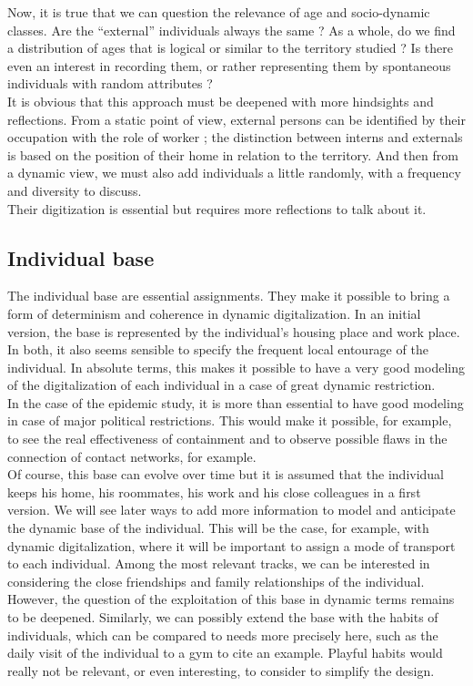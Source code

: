 Now, it is true that we can question the relevance of age and socio-dynamic classes. Are the ``external'' individuals always the same ? As a whole, do we find a distribution of ages that is logical or similar to the territory studied ? Is there even an interest in recording them, or rather representing them by spontaneous individuals with random attributes ?\\

It is obvious that this approach must be deepened with more hindsights and reflections. From a static point of view, external persons can be identified by their occupation with the role of worker ; the distinction between interns and externals is based on the position of their home in relation to the territory. And then from a dynamic view, we must also add individuals a little randomly, with a frequency and diversity to discuss.\\

Their digitization is essential but requires more reflections to talk about it.\\

\subsection{Individual base}

The individual base are essential assignments. They make it possible to bring a form of determinism and coherence in dynamic digitalization. In an initial version, the base is represented by the individual's housing place and work place. In both, it also seems sensible to specify the frequent local entourage of the individual. In absolute terms, this makes it possible to have a very good modeling of the digitalization of each individual in a case of great dynamic restriction.\\

In the case of the epidemic study, it is more than essential to have good modeling in case of major political restrictions. This would make it possible, for example, to see the real effectiveness of containment and to observe possible flaws in the connection of contact networks, for example.\\

Of course, this base can evolve over time but it is assumed that the individual keeps his home, his roommates, his work and his close colleagues in a first version. We will see later ways to add more information to model and anticipate the dynamic base of the individual. This will be the case, for example, with dynamic digitalization, where it will be important to assign a mode of transport to each individual. Among the most relevant tracks, we can be interested in considering the close friendships and family relationships of the individual. However, the question of the exploitation of this base in dynamic terms remains to be deepened. Similarly, we can possibly extend the base with the habits of individuals, which can be compared to needs more precisely here, such as the daily visit of the individual to a gym to cite an example. Playful habits would really not be relevant, or even interesting, to consider to simplify the design.\\

